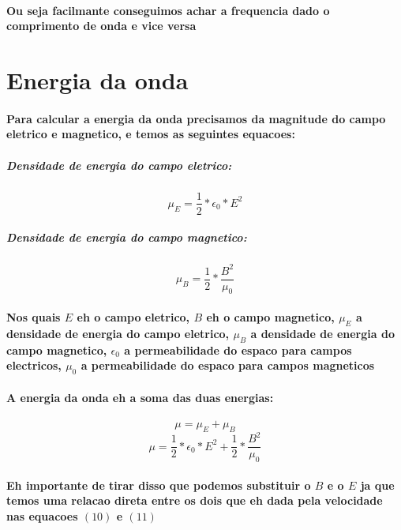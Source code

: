 \documentclass[12pt,twoside, a4paper, twocolumn]{article}
\begin{document}
\paragraph*{Ou seja facilmante conseguimos achar a frequencia dado o comprimento de onda e vice versa}

\section{Energia da onda}
\paragraph*{Para calcular a energia da onda precisamos da magnitude do campo eletrico e magnetico, e temos as seguintes equacoes:}

\subparagraph*{Densidade de energia do campo eletrico:}
\begin{equation}
    \mu_E = \frac{1}{2} * \epsilon_0 * E^2
\end{equation}

\subparagraph*{Densidade de energia do campo magnetico:}
\begin{equation}
    \mu_B = \frac{1}{2} * \frac{B^2}{\mu_0}
\end{equation}

\paragraph{Nos quais $E$ eh o campo eletrico, $B$ eh o campo magnetico, $\mu_E$ a densidade de energia do campo eletrico, $\mu_B$ a densidade de energia do campo magnetico, $\epsilon_0$ a permeabilidade do espaco para campos electricos, $\mu_0$ a permeabilidade do espaco para campos magneticos}
\paragraph{A energia da onda eh a soma das duas energias:}
\begin{equation}
    \mu = \mu_E + \mu_B
\end{equation}
\begin{equation}
    \mu = \frac{1}{2} * \epsilon_0 * E^2 + \frac{1}{2} * \frac{B^2}{\mu_0}
\end{equation}
\paragraph{Eh importante de tirar disso que podemos substituir o $B$ e o $E$ ja que temos uma relacao direta entre os dois que eh dada pela velocidade nas equacoes $(10)$ e $(11)$}
\end{document}
